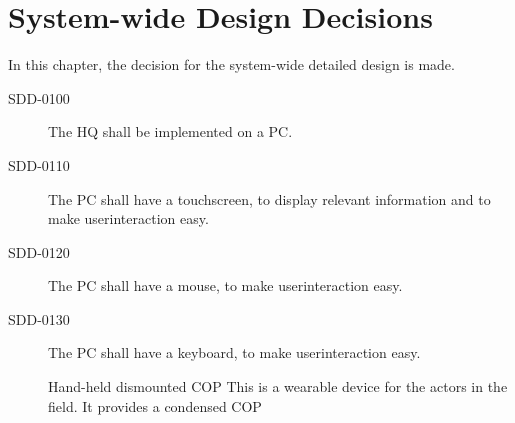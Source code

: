 \chapter{System-wide Design Decisions}

In this chapter, the decision for the system-wide detailed design is made.

\begin{description}
\item[SDD-0100] The HQ shall be implemented on a PC.
\item[SDD-0110] The PC shall have a touchscreen, to display relevant information and to make userinteraction easy.
\item[SDD-0120] The PC shall have a mouse, to make userinteraction easy.
\item[SDD-0130] The PC shall have a keyboard, to make userinteraction easy.


Hand-held dismounted COP This is a wearable device for the actors in the field. It
provides a condensed COP
\end{description}